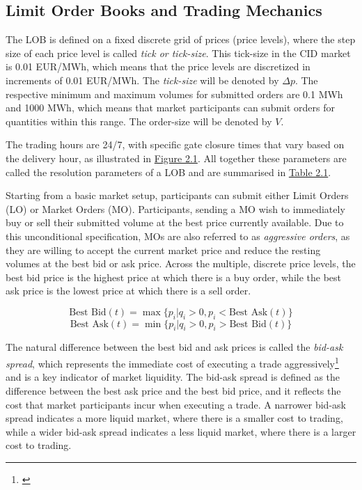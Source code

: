 \documentclass[12pt,a4paper]{cau_thesis}
\begin{document}
\subsection{Limit Order Books and Trading Mechanics}\label{sub_sec:limit_order_books_and_trading_mechanics}
The LOB is defined on a fixed discrete grid of prices (price levels),
where the step size of each price level is called \textit{tick or
    tick-size}. This tick-size in the CID market is 0.01 EUR/MWh, which
means that the price levels are discretized in increments of 0.01
EUR/MWh. The \textit{tick-size} will be denoted by $\Delta p$. The
respective minimum and maximum volumes for submitted orders are 0.1
MWh and 1000 MWh, which means that market participants can submit
orders for quantities within this range. The order-size will be
denoted by $V$.

The trading hours are 24/7, with specific gate closure times that
vary based on the delivery hour, as illustrated in
\hyperref[fig:european_power_market_design]{Figure 2.1}. All together
these parameters are called the resolution parameters of a LOB and
are summarised in \hyperref[tab:epex_cid_parameters]{Table 2.1}.

Starting from a basic market setup, participants can submit either
Limit Orders (LO) or Market Orders (MO). Participants, sending a MO
wish to immediately buy or sell their submitted volume at the best
price currently available. Due to this unconditional specification,
MOs are also referred to as \textit{aggressive orders}, as they are
willing to accept the current market price and reduce the resting
volumes at the best bid or ask price. Across the multiple, discrete
price levels, the best bid price is the highest price at which there
is a buy order, while the best ask price is the lowest price at which
there is a sell order.

\begin{definition}
    \begin{equation}
        \text{Best Bid}(t) = \max\{p_i | q_i > 0, p_i < \text{Best Ask}(t)\}
    \end{equation}
    \begin{equation}
        \text{Best Ask}(t) = \min\{p_i | q_i > 0, p_i > \text{Best Bid}(t)\}
    \end{equation}
    \label{def:best_bid_ask_prices}
\end{definition}

The natural difference between the best bid and ask prices is called
the \textit{bid-ask spread}, which represents the immediate cost of
executing a trade aggressively\footnote{\cite[See][, p.70,
    ]{cartea2015algorithmic} \cite[See ][, p.35-36]{demsetz1968cost}} and
is a key indicator of market liquidity. The bid-ask spread is defined
as the difference between the best ask price and the best bid price,
and it reflects the cost that market participants incur when
executing a trade. A narrower bid-ask spread indicates a more liquid
market, where there is a smaller cost to trading, while a wider
bid-ask spread indicates a less liquid market, where there is a
larger cost to trading.
\end{document}
